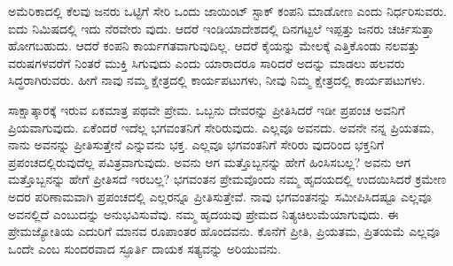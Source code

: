 ಅಮೆರಿಕಾದಲ್ಲಿ ಕೆಲವು ಜನರು ಒಟ್ಟಿಗೆ ಸೇರಿ ಒಂದು ಜಾಯಿಂಟ್​ ಸ್ಟಾಕ್​ ಕಂಪನಿ ಮಾಡೋಣ ಎಂದು ನಿರ್ಧರಿಸುವರು. ಐದು ನಿಮಿಷದಲ್ಲಿ ಇದು ನೆರವೇರು ವುದು. ಆದರೆ ಇಂಡಿಯಾದೇಶದಲ್ಲಿ ದಿನಗಟ್ಟಲೆ ಇಪ್ಪತ್ತು ಜನರು ಚರ್ಚಿಸುತ್ತಾ ಹೋಗಬಹುದು. ಆದರೆ ಕಂಪನಿ ಕಾರ್ಯಗತವಾಗುವುದಿಲ್ಲ. ಆದರೆ ಕೈಯನ್ನು ಮೇಲಕ್ಕೆ ಎತ್ತಿಕೊಂಡು ನಲವತ್ತು ವರುಷಗಳವರೆಗೆ ನಿಂತರೆ ಮುಕ್ತಿ ಸಿಗುವುದು ಎಂದು ಯಾರಾದರೂ ಸಾರಿದರೆ ಅದನ್ನು ಮಾಡಲು ಹಲವರು ಸಿದ್ಧರಾಗಿರುವರು. ಹೀಗೆ ನಾವು ನಮ್ಮ ಕ್ಷೇತ್ರದಲ್ಲಿ ಕಾರ್ಯಪಟುಗಳು, ನೀವು ನಿಮ್ಮ ಕ್ಷೇತ್ರದಲ್ಲಿ ಕಾರ್ಯಪಟುಗಳು.

ಸಾಕ್ಷಾತ್ಕಾರಕ್ಕೆ ಇರುವ ಏಕಮಾತ್ರ ಪಥವೇ ಪ್ರೇಮ. ಒಬ್ಬನು ದೇವರನ್ನು ಪ್ರೀತಿಸಿದರೆ ಇಡೀ ಪ್ರಪಂಚ ಅವನಿಗೆ ಪ್ರಿಯವಾಗುವುದು. ಏಕೆಂದರೆ ಇದೆಲ್ಲ ಭಗವಂತನಿಗೆ ಸೇರಿರುವುದು. ಎಲ್ಲವೂ ಅವನದು. ಅವನೇ ನನ್ನ ಪ್ರಿಯತಮ, ನಾನು ಅವನನ್ನು ಪ್ರೀತಿಸುತ್ತೇನೆ ಎನ್ನುವನು ಭಕ್ತ. ಎಲ್ಲವೂ ಭಗವಂತನಿಗೆ ಸೇರಿರು ವುದರಿಂದ ಭಕ್ತನಿಗೆ ಪ್ರಪಂಚದಲ್ಲಿರುವುದೆಲ್ಲ ಪವಿತ್ರವಾಗುವುದು. ಅವನು ಆಗ ಮತ್ತೊಬ್ಬನನ್ನು ಹೇಗೆ ಹಿಂಸಿಸಬಲ್ಲ? ಅವನು ಆಗ ಮತ್ತೊಬ್ಬನನ್ನು ಹೇಗೆ ಪ್ರೀತಿಸದೆ ಇರಬಲ್ಲ? ಭಗವಂತನ ಪ್ರೇಮವೊಂದು ನಮ್ಮ ಹೃದಯದಲ್ಲಿ ಉದಯಿಸಿದರೆ ಕ್ರಮೇಣ ಅದರ ಪರಿಣಾಮವಾಗಿ ಪ್ರಪಂಚದಲ್ಲಿ ಎಲ್ಲರನ್ನೂ ಪ್ರೀತಿಸುತ್ತೇವೆ. ನಾವು ಭಗವಂತನನ್ನು ಸಮೀಪಿಸಿದಷ್ಟೂ ಎಲ್ಲವೂ ಅವನಲ್ಲಿದೆ ಎಂಬುದನ್ನು ಅನುಭವಿಸುವೆವು. ನಮ್ಮ ಹೃದಯವು ಪ್ರೇಮದ ನಿತ್ಯಚಿಲುಮೆಯಾಗುವುದು. ಈ ಪ್ರೇಮಜ್ಯೋತಿಯ ಎದುರಿಗೆ ಮಾನವ ರೂಪಾಂತರ ಹೊಂದವನು. ಕೊನೆಗೆ ಪ್ರೀತಿ, ಪ್ರಿಯತಮ, ಪ್ರಿತಯಮೆ ಎಲ್ಲವೂ ಒಂದೇ ಎಂಬ ಸುಂದರವಾದ ಸ್ಫೂರ್ತಿ ದಾಯಕ ಸತ್ಯವನ್ನು ಅರಿಯುವನು.

